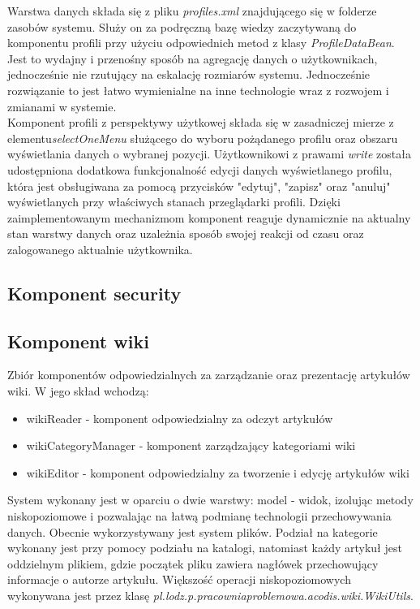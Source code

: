 \documentclass{classrep}
\begin{document}
Warstwa danych składa się z pliku \textit{profiles.xml} znajdującego się w folderze zasobów systemu. Służy on za podręczną bazę wiedzy zaczytywaną do komponentu profili przy użyciu odpowiednich metod z klasy \textit{ProfileDataBean}. Jest to wydajny i przenośny sposób na agregację danych o użytkownikach, jednocześnie nie rzutujący na eskalację rozmiarów systemu. Jednocześnie rozwiązanie to jest łatwo wymienialne na inne technologie wraz z rozwojem i zmianami w systemie. \\
Komponent profili z perspektywy użytkowej składa się w zasadniczej mierze z elementu\textit{selectOneMenu} służącego do wyboru pożądanego profilu oraz obszaru wyświetlania danych o wybranej pozycji. Użytkownikowi z prawami \textit{write} została udostępniona dodatkowa funkcjonalność edycji danych wyświetlanego profilu, która jest obsługiwana za pomocą przycisków "edytuj", "zapisz" oraz "anuluj" wyświetlanych przy właściwych stanach przeglądarki profili. Dzięki zaimplementowanym mechanizmom komponent reaguje dynamicznie na aktualny stan warstwy danych oraz uzależnia sposób swojej reakcji od czasu oraz zalogowanego aktualnie użytkownika.

\subsection{Komponent security}

\subsection{Komponent wiki}
Zbiór komponentów odpowiedzialnych za zarządzanie oraz prezentację artykułów wiki. W jego skład wchodzą:
\begin{itemize}
\item wikiReader - komponent odpowiedzialny za odczyt artykułów
\item wikiCategoryManager - komponent zarządzający kategoriami wiki
\item wikiEditor - komponent odpowiedzialny za tworzenie i edycję artykułów wiki
\end{itemize}

System wykonany jest w oparciu o dwie warstwy: model - widok, izolując metody niskopoziomowe i pozwalając na łatwą podmianę technologii przechowywania danych. Obecnie wykorzystywany jest system plików. Podział na kategorie wykonany jest przy pomocy podziału na katalogi, natomiast każdy artykuł jest oddzielnym plikiem, gdzie początek pliku zawiera nagłówek przechowujący informacje o autorze artykułu. Większość operacji niskopoziomowych wykonywana jest przez klasę \textit{pl.lodz.p.pracowniaproblemowa.acodis.wiki.WikiUtils}.
\end{document}
